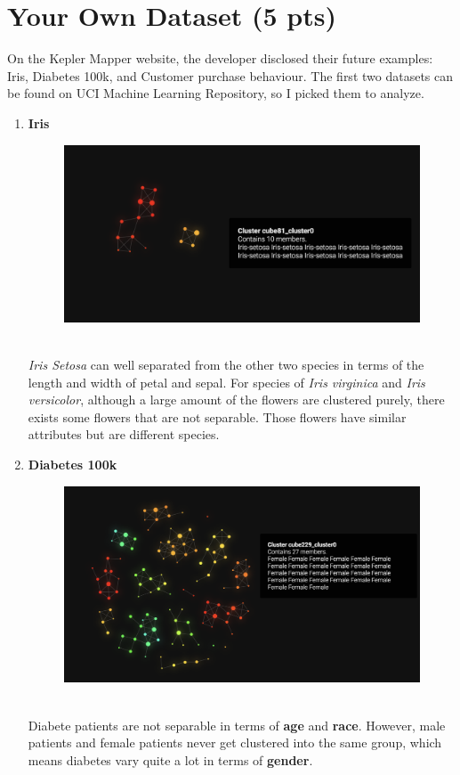 \documentclass[12pt]{article}
\begin{document}
\section{Your Own Dataset (5 pts)}
On the Kepler Mapper website, the developer disclosed their future examples: Iris, Diabetes 100k, and Customer purchase behaviour. The first two datasets can be found on UCI Machine Learning Repository, so I picked them to analyze.
\begin{enumerate}
\item \textbf{Iris}
\begin{figure}[h]
\centering
\includegraphics[width=.6\linewidth]{1.png}
\label{fig:name}
\end{figure}\\
\textit{Iris Setosa} can well separated from the other two species in terms of the length and width of petal and sepal. For species of \textit{Iris virginica} and \textit{Iris versicolor}, although a large amount of the flowers are clustered purely, there exists some flowers that are not separable. Those flowers have similar attributes but are different species.

\item \textbf{Diabetes 100k}
\begin{figure}[h]
\centering
\includegraphics[width=.6\linewidth]{2.png}
\label{fig:name}
\end{figure}\\
Diabete patients are not separable in terms of \textbf{age} and \textbf{race}. However, male patients and female patients never get clustered into the same group, which means diabetes vary quite a lot in terms of \textbf{gender}. 
\end{enumerate}
\end{document}
